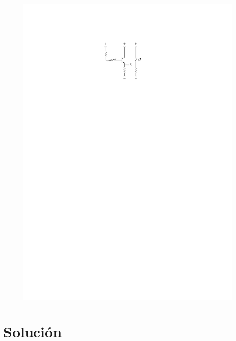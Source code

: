 \documentclass[compress]{beamer}
\begin{document}
\begin{frame}
\begin{figure}
					\includegraphics[keepaspectratio = true, totalheight=0.5\textheight]{figuras/circuito.pdf}
				\end{figure}
		\end{frame}

\section{Soluci\'on}
\end{document}

